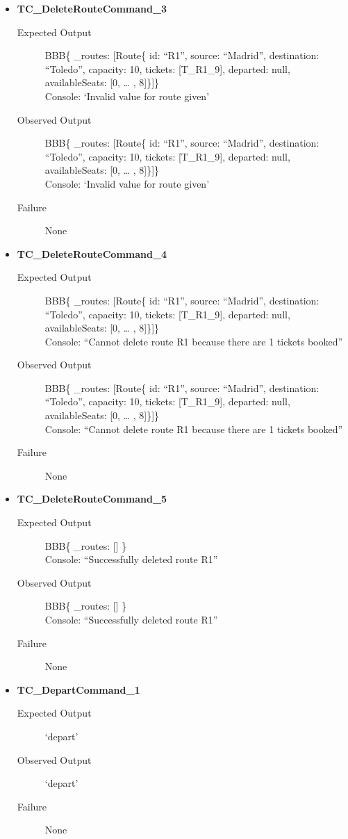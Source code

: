 \documentclass[11pt]{article}
\begin{document}
\begin{itemize}
\item \textbf{TC\_DeleteRouteCommand\_3}
\begin{description}
\item[{Expected Output}] BBB\{ \_routes: [Route\{ id: “R1”, source: “Madrid”, destination: “Toledo”, capacity: 10,  tickets: [T\_R1\_9], departed: null, availableSeats: [0, … , 8]\}]\}\\
Console: ‘Invalid value for route given’
\item[{Observed Output}] BBB\{ \_routes: [Route\{ id: “R1”, source: “Madrid”, destination: “Toledo”, capacity: 10,  tickets: [T\_R1\_9], departed: null, availableSeats: [0, … , 8]\}]\}\\
Console: ‘Invalid value for route given’
\item[{Failure}] None
\end{description}

\item \textbf{TC\_DeleteRouteCommand\_4}
\begin{description}
\item[{Expected Output}] BBB\{ \_routes: [Route\{ id: “R1”, source: “Madrid”, destination: “Toledo”, capacity: 10,  tickets: [T\_R1\_9], departed: null, availableSeats: [0, … , 8]\}]\}\\
Console: “Cannot delete route R1 because there are 1 tickets booked”
\item[{Observed Output}] BBB\{ \_routes: [Route\{ id: “R1”, source: “Madrid”, destination: “Toledo”, capacity: 10,  tickets: [T\_R1\_9], departed: null, availableSeats: [0, … , 8]\}]\}\\
Console: “Cannot delete route R1 because there are 1 tickets booked”
\item[{Failure}] None
\end{description}

\item \textbf{TC\_DeleteRouteCommand\_5}
\begin{description}
\item[{Expected Output}] BBB\{ \_routes: [] \}\\
Console: “Successfully deleted route R1”
\item[{Observed Output}] BBB\{ \_routes: [] \}\\
Console: “Successfully deleted route R1”
\item[{Failure}] None
\end{description}

\item \textbf{TC\_DepartCommand\_1}
\begin{description}
\item[{Expected Output}] ‘depart’
\item[{Observed Output}] ‘depart’
\item[{Failure}] None
\end{description}


\end{itemize}
\end{document}
